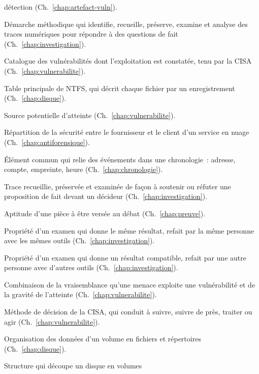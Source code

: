 \begin{description}
          détection (Ch.~\ref{chap:artefact-vuln}).
    \item[Investigation numérique] Démarche méthodique qui identifie,
          recueille, préserve, examine et analyse des traces numériques pour
          répondre à des questions de fait (Ch.~\ref{chap:investigation}).
    \item[KEV] Catalogue des vulnérabilités dont l'exploitation est constatée,
          tenu par la CISA (Ch.~\ref{chap:vulnerabilite}).
    \item[MFT] Table principale de NTFS, qui décrit chaque fichier par un
          enregistrement (Ch.~\ref{chap:disque}).
    \item[Menace] Source potentielle d'atteinte (Ch.~\ref{chap:vulnerabilite}).
    \item[Modèle de responsabilité partagée] Répartition de la sécurité entre
          le fournisseur et le client d'un service en nuage
          (Ch.~\ref{chap:antiforensique}).
    \item[Pivot] Élément commun qui relie des événements dans une
          chronologie~: adresse, compte, empreinte, heure
          (Ch.~\ref{chap:chronologie}).
    \item[Preuve numérique] Trace recueillie, préservée et examinée de façon à
          soutenir ou réfuter une proposition de fait devant un décideur
          (Ch.~\ref{chap:investigation}).
    \item[Recevabilité] Aptitude d'une pièce à être versée au débat
          (Ch.~\ref{chap:preuve}).
    \item[Répétabilité] Propriété d'un examen qui donne le même résultat,
          refait par la même personne avec les mêmes outils
          (Ch.~\ref{chap:investigation}).
    \item[Reproductibilité] Propriété d'un examen qui donne un résultat
          compatible, refait par une autre personne avec d'autres outils
          (Ch.~\ref{chap:investigation}).
    \item[Risque] Combinaison de la vraisemblance qu'une menace exploite une
          vulnérabilité et de la gravité de l'atteinte
          (Ch.~\ref{chap:vulnerabilite}).
    \item[SSVC] Méthode de décision de la CISA, qui conduit à suivre, suivre
          de près, traiter ou agir (Ch.~\ref{chap:vulnerabilite}).
    \item[Système de fichiers] Organisation des données d'un volume en
          fichiers et répertoires (Ch.~\ref{chap:disque}).
    \item[Table de partitions] Structure qui découpe un disque en volumes

\end{description}
